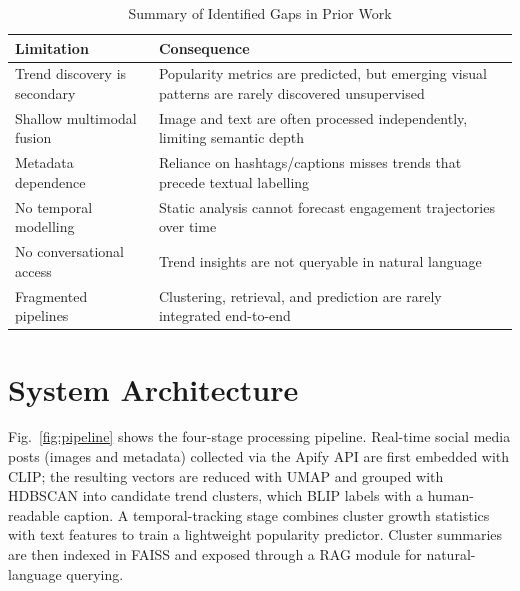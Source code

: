 \documentclass[conference]{IEEEtran}
\begin{document}
\begin{table}[t]
\caption{Summary of Identified Gaps in Prior Work}
\label{tab:gaps}
\centering
\renewcommand{\arraystretch}{1.15}
\begin{tabular}{p{2.6cm}p{5cm}}
\toprule
\textbf{Limitation} & \textbf{Consequence} \\
\midrule
Trend discovery is secondary & Popularity metrics are predicted, but emerging visual patterns are rarely discovered unsupervised \\
Shallow multimodal fusion & Image and text are often processed independently, limiting semantic depth \\
Metadata dependence & Reliance on hashtags/captions misses trends that precede textual labelling \\
No temporal modelling & Static analysis cannot forecast engagement trajectories over time \\
No conversational access & Trend insights are not queryable in natural language \\
Fragmented pipelines & Clustering, retrieval, and prediction are rarely integrated end-to-end \\
\bottomrule
\end{tabular}
\end{table}

\section{System Architecture}

Fig.~\ref{fig:pipeline} shows the four-stage processing pipeline. Real-time social media posts (images and metadata) collected via the Apify API are first embedded with CLIP; the resulting vectors are reduced with UMAP and grouped with HDBSCAN into candidate trend clusters, which BLIP labels with a human-readable caption. A temporal-tracking stage combines cluster growth statistics with text features to train a lightweight popularity predictor. Cluster summaries are then indexed in FAISS and exposed through a RAG module for natural-language querying.
\end{document}
